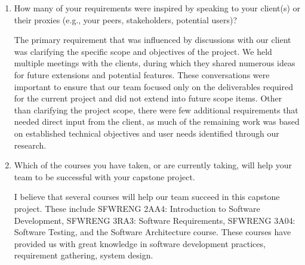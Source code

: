 \begin{enumerate}
  \item How many of your requirements were inspired by speaking to your client(s) or their proxies (e.g., your peers, stakeholders, potential users)?

    \par{The primary requirement that was influenced by discussions with our client was clarifying the specific scope and objectives of the project. We held multiple meetings with the clients, during which they shared numerous ideas for future extensions and potential features. These conversations were important to ensure that our team focused only on the deliverables required for the current project and did not extend into future scope items. Other than clarifying the project scope, there were few additional requirements that needed direct input from the client, as much of the remaining work was based on established technical objectives and user needs identified through our research.}

  \item Which of the courses you have taken, or are currently taking, will help
  your team to be successful with your capstone project.

    \par{I believe that several courses will help our team succeed in this capstone project. These include SFWRENG 2AA4: Introduction to Software Development, SFWRENG 3RA3: Software Requirements, SFWRENG 3A04: Software Testing, and the Software Architecture course. These courses have provided us with great knowledge in software development practices, requirement gathering, system design.}


\end{enumerate}